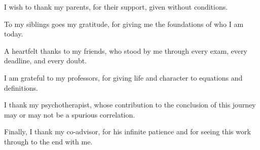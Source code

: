 \begin{acknowledgments}

I wish to thank my parents, for their support, given without conditions.

To my siblings goes my gratitude, for giving me the foundations of who I am today.

A heartfelt thanks to my friends, who stood by me through every exam, every deadline, and every doubt.

I am grateful to my professors, for giving life and character to equations and definitions.

I thank my psychotherapist, whose contribution to the conclusion of this journey may or may not be a spurious correlation.

Finally, I thank my co-advisor, for his infinite patience and for seeing this work through to the end with me.

\end{acknowledgments}
